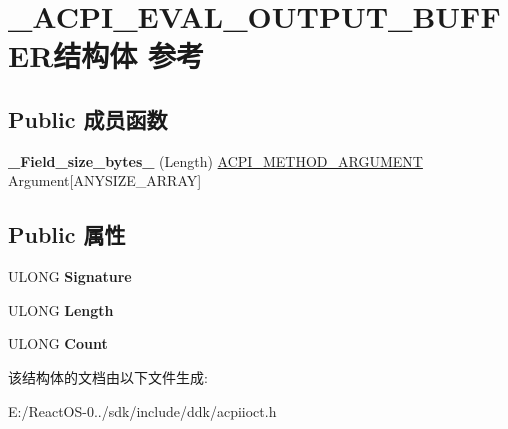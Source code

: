 \hypertarget{struct___a_c_p_i___e_v_a_l___o_u_t_p_u_t___b_u_f_f_e_r}{}\section{\+\_\+\+A\+C\+P\+I\+\_\+\+E\+V\+A\+L\+\_\+\+O\+U\+T\+P\+U\+T\+\_\+\+B\+U\+F\+F\+E\+R结构体 参考}
\label{struct___a_c_p_i___e_v_a_l___o_u_t_p_u_t___b_u_f_f_e_r}
\subsection*{Public 成员函数}
\begin{DoxyCompactItemize}
\item 
\mbox{\label{struct___a_c_p_i___e_v_a_l___o_u_t_p_u_t___b_u_f_f_e_r_ac0369aa324b89a7c1edec0e89ed69035}} 
{\bfseries \+\_\+\+Field\+\_\+size\+\_\+bytes\+\_\+} (Length) \hyperlink{struct___a_c_p_i___m_e_t_h_o_d___a_r_g_u_m_e_n_t}{A\+C\+P\+I\+\_\+\+M\+E\+T\+H\+O\+D\+\_\+\+A\+R\+G\+U\+M\+E\+NT} Argument\mbox{[}A\+N\+Y\+S\+I\+Z\+E\+\_\+\+A\+R\+R\+AY\mbox{]}
\end{DoxyCompactItemize}
\subsection*{Public 属性}
\begin{DoxyCompactItemize}
\item 
\mbox{\label{struct___a_c_p_i___e_v_a_l___o_u_t_p_u_t___b_u_f_f_e_r_a56626b5f5e61df53ba9cc19e969e8c8c}} 
U\+L\+O\+NG {\bfseries Signature}
\item 
\mbox{\label{struct___a_c_p_i___e_v_a_l___o_u_t_p_u_t___b_u_f_f_e_r_aac56a2b96c01257776b41b9cccb6d635}} 
U\+L\+O\+NG {\bfseries Length}
\item 
\mbox{\label{struct___a_c_p_i___e_v_a_l___o_u_t_p_u_t___b_u_f_f_e_r_a3930fa9a48e3848bfe0f44e42c7ee6ee}} 
U\+L\+O\+NG {\bfseries Count}
\end{DoxyCompactItemize}


该结构体的文档由以下文件生成\+:\begin{DoxyCompactItemize}
\item 
E\+:/\+React\+O\+S-\/0../sdk/include/ddk/acpiioct.\+h\end{DoxyCompactItemize}
